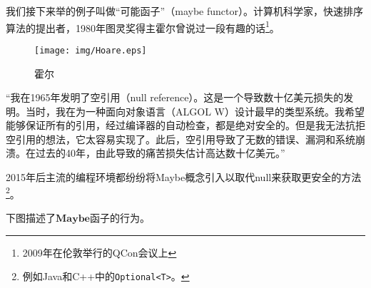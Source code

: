 \documentclass{article}
\begin{document}
\begin{example}
 
我们接下来举的例子叫做“可能函子”（maybe functor）。计算机科学家，快速排序算法的提出者，1980年图灵奖得主霍尔曾说过一段有趣的话\footnote{2009年在伦敦举行的QCon会议上}。

\begin{figure}[h!]
 \centering
 \texttt{[image: img/Hoare.eps]}
 \captionsetup{labelformat=empty}
 \caption{霍尔}
 \label{fig:Hoare}
\end{figure}

“我在1965年发明了空引用（null reference）。这是一个导致数十亿美元损失的发明。当时，我在为一种面向对象语言（ALGOL W）设计最早的类型系统。我希望能够保证所有的引用，经过编译器的自动检查，都是绝对安全的。但是我无法抗拒空引用的想法，它太容易实现了。此后，空引用导致了无数的错误、漏洞和系统崩溃。在过去的40年，由此导致的痛苦损失估计高达数十亿美元。”\cite{Wiki-Hoare}


2015年后主流的编程环境都纷纷将Maybe概念引入以取代null来获取更安全的方法\footnote{例如Java和C++中的\texttt{Optional<T>}。}。

下图描述了$\mathbf{Maybe}$函子的行为。

\begin{center}
\end{center}


\end{example}
\end{document}
